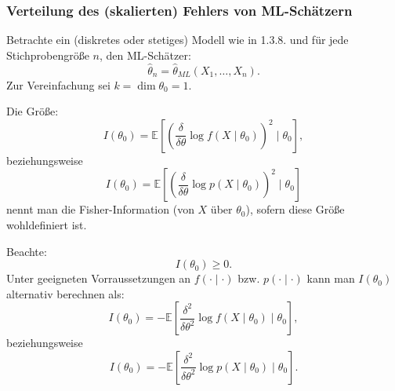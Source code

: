 \documentclass[10pt]{article}
\newcommand{\FZV}{X_1, \ldots, X_n} %
\newcommand{\EW}{\mathbb{E}} %
\newcommand{\eqname}[1]{\tag*{#1}}%
\begin{document}
	\subsubsection{Verteilung des (skalierten) Fehlers von ML-Schätzern}

	\begin{Definition}
		Betrachte ein (diskretes oder stetiges) Modell wie in 1.3.8. und für jede Stichprobengröße $n$, den ML-Schätzer: 
	\begin{equation*}
		\hat{\theta}_n = \hat{\theta}_{ML}(\FZV).
	\end{equation*}
	Zur Vereinfachung sei $k = \dim \theta_0 = 1$.
	
	Die Größe:
	\begin{equation*}
		I(\theta_0) = \EW\left[\left(\frac{\delta}{\delta \theta} \log f( X\mid \theta_0)\right)^2 \mid \theta_0 \right], \eqname{(stetig)}
	\end{equation*}
	beziehungsweise
	\begin{equation*}
		I(\theta_0) = \EW\left[\left(\frac{\delta}{\delta \theta} \log p( X\mid \theta_0)\right)^2 \mid \theta_0 \right] \eqname{(diskret)}
	\end{equation*}
	nennt man die Fisher-Information (von $X$ über $\theta_0$), sofern diese Größe wohldefiniert ist. 
	
	Beachte:
	\begin{equation*}
		I(\theta_0) \geq 0.
	\end{equation*}
	Unter geeigneten Vorraussetzungen an $f(\cdot \mid \cdot)$ bzw. $p(\cdot \mid \cdot)$ kann man $I(\theta_0)$ alternativ berechnen als:
	\begin{equation*}
		I(\theta_0) = -\EW \left[\frac{\delta^2}{\delta \theta^2} \log f(X\mid\theta_0) \mid \theta_0 \right], \eqname{(stetig)}
	\end{equation*}
	beziehungsweise
	\begin{equation*}
		I(\theta_0) = -\EW \left[\frac{\delta^2}{\delta \theta^2} \log p(X\mid\theta_0) \mid \theta_0 \right]. \eqname{(diskret)}
	\end{equation*}
	\end{Definition}
	
\end{document}
